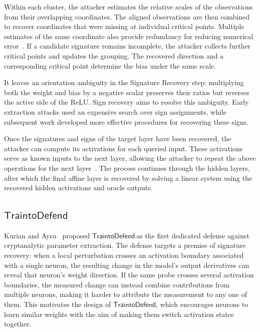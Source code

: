 \documentclass[runningheads]{llncs}
\newcommand{\mypara}[1]{\smallskip\noindent{\bf {#1}.} \xspace}
\newcommand{\td}{$\mathsf{Train to Defend}~$}
\newcommand{\nospacetd}{$\mathsf{Train to Defend}$}
\begin{document}
Within each cluster, the attacker estimates the relative scales of the observations from their overlapping coordinates.
The aligned observations are then combined to recover coordinates that were missing at individual critical points.
Multiple estimates of the same coordinate also provide redundancy for reducing numerical error~\cite{carlini_crypto_cea1,foerster_neurips_cea5}.
If a candidate signature remains incomplete, the attacker collects further critical points and updates the grouping.
The recovered direction and a corresponding critical point determine the bias under the same scale.

\mypara{Step-III: Sign Recovery}
It leaves an orientation ambiguity in the Signature Recovery step: multiplying both the weight and bias by a negative scalar preserves their ratios but reverses the active side of the ReLU.
Sign recovery aims to resolve this ambiguity.
Early extraction attacks used an expensive search over sign assignments, while subsequent work developed more effective procedures for recovering these signs\cite{carlini_crypto_cea1,canales_eurocrypt_cea2,foerster_neurips_cea5,cryptoeprint:2026/2061-Normal-Alignment-Improved-Cryptanalytic-Sign-Recovery-on-Hard-Label-Networks,cryptoeprint:2026/2097-Efficient-Sign-Recovery}.

\mypara{Step-IV: Layer-by-Layer Peeling}
Once the signatures and signs of the target layer have been recovered, the attacker can compute its activations for each queried input.
These activations serve as known inputs to the next layer, allowing the attacker to repeat the above operations for the next layer~\cite{carlini_crypto_cea1,liu_eurocrypt_cea6}.
The process continues through the hidden layers, after which the final affine layer is recovered by solving a linear system using the recovered hidden activations and oracle outputs.

\subsection{\td}\label{bg:t2d}

Kurian and Aysu~\cite{kurian_neurips_ced1} proposed \td as the first dedicated defense against cryptanalytic parameter extraction.
The defense targets a premise of signature recovery: when a local perturbation crosses an activation boundary associated with a single neuron, the resulting change in the model's output derivatives can reveal that neuron's weight direction.
If the same probe crosses several activation boundaries, the measured change can instead combine contributions from multiple neurons, making it harder to attribute the measurement to any one of them.
This motivates the design of \nospacetd, which encourages neurons to learn similar weights with the aim of making them switch activation states together.
\end{document}
